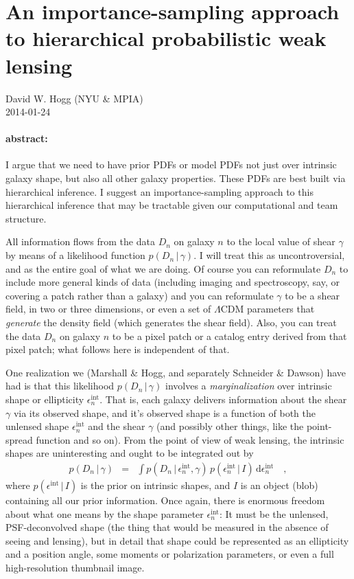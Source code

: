 \documentclass[12pt]{article}
\newcommand{\given}{\,|\,}
\newcommand{\data}{D}
\newcommand{\shear}{\gamma}
\newcommand{\ellip}{\epsilon}
\newcommand{\intrinsic}{\ellip^{\mathrm{int}}}
\newcommand{\prior}{I}
\newcommand{\dd}{\mathrm{d}}
\begin{document}
\sloppy\sloppypar

\section*{An importance-sampling approach\\ to hierarchical probabilistic weak lensing}

\smallskip\noindent
David W. Hogg (NYU \& MPIA)\\
2014-01-24

\paragraph{abstract:}
I argue that we need to have prior PDFs or model PDFs not just over intrinsic galaxy shape,
  but also all other galaxy properties.
These PDFs are best built via hierarchical inference.
I suggest an importance-sampling approach to this hierarchical inference that may be tractable
  given our computational and team structure.

\bigskip

All information flows from the data $\data_n$ on galaxy $n$ to the local value of shear $\shear$
  by means of a likelihood function $p(\data_n\given\shear)$.
I will treat this as uncontroversial,
  and as the entire goal of what we are doing.
Of course you can reformulate $\data_n$ to include more general kinds of data
  (including imaging and spectroscopy, say, or covering a patch rather than a galaxy)
  and you can reformulate $\gamma$ to be a shear field, in two or three dimensions,
  or even a set of $\Lambda$CDM parameters that \emph{generate} the density field
  (which generates the shear field).
Also, you can treat the data $\data_n$ on galaxy $n$ to be a pixel patch
  or a catalog entry derived from that pixel patch;
  what follows here is independent of that.

One realization we (Marshall \& Hogg, and separately Schneider \& Dawson) have had is
  that this likelihood $p(\data_n\given\shear)$ involves a \emph{marginalization}
  over intrinsic shape or ellipticity $\intrinsic_n$.
That is, each galaxy delivers information about the shear $\gamma$ via its observed shape,
  and it's observed shape is a function of both the unlensed shape $\intrinsic_n$
  and the shear $\gamma$ (and possibly other things, like the point-spread function and so on).
From the point of view of weak lensing, the intrinsic shapes are uninteresting and ought to be integrated out by
\begin{eqnarray}
p(\data_n\given\shear)
  &=& \int p(\data_n\given\intrinsic_n,\shear)\,p(\intrinsic_n\given\prior)\,\dd\intrinsic_n
  \quad ,
\end{eqnarray}
  where $p(\intrinsic\given\prior)$ is the prior on intrinsic shapes,
  and $\prior$ is an object (blob) containing all our prior information.
Once again, there is enormous freedom about what one means by the shape parameter $\intrinsic_n$:
It must be the unlensed, PSF-deconvolved shape
  (the thing that would be measured in the absence of seeing and lensing),
  but in detail that shape could be represented as an ellipticity and a position angle,
  some moments or polarization parameters,
  or even a full high-resolution thumbnail image.
\end{document}
